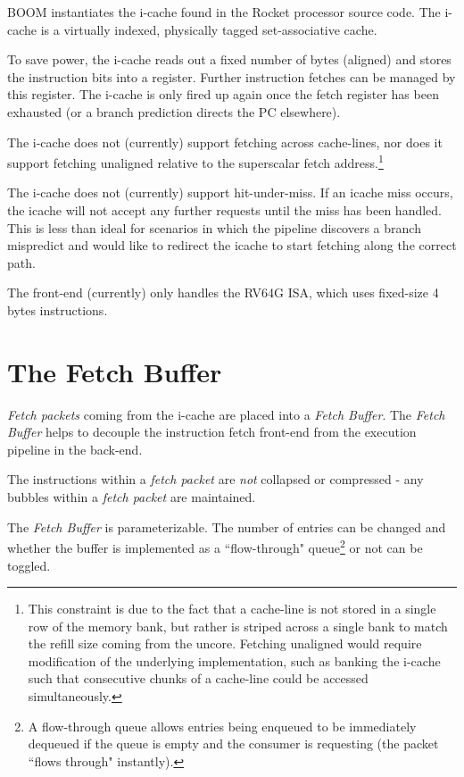 BOOM instantiates the i-cache found in the Rocket processor source code.  The i-cache is a virtually indexed, physically tagged set-associative cache. 

To save power, the i-cache reads out a fixed number of bytes (aligned) and stores the instruction bits into a register. Further instruction fetches can be managed by this register. The i-cache is only fired up again once the fetch register has been exhausted (or a branch prediction directs the PC elsewhere).  

 
The i-cache does not (currently) support fetching across cache-lines, nor does it support fetching unaligned relative to the superscalar fetch address.\footnote{This constraint is due to the fact that a cache-line is not stored in a single row of the memory bank, but rather is striped across a single bank to match the refill size coming from the uncore.  Fetching unaligned would require modification of the underlying implementation, such as banking the i-cache such that consecutive chunks of a cache-line could be accessed simultaneously.}

The i-cache does not (currently) support hit-under-miss.  If an icache miss occurs, the icache will not accept any further requests until the miss has been handled.  This is less than ideal for scenarios in which the pipeline discovers a branch mispredict and would like to redirect the icache to start fetching along the correct path. 


The front-end (currently) only handles the RV64G ISA, which uses fixed-size 4 bytes instructions. 

\section{The Fetch Buffer}

{\em Fetch packets} coming from the i-cache are placed into a {\em Fetch Buffer}.  The {\em Fetch Buffer} helps to decouple the instruction fetch front-end from the execution pipeline in the back-end. 

The instructions within a {\em fetch packet} are {\em not} collapsed or compressed - any bubbles within a {\em fetch packet} are maintained. 

The {\em Fetch Buffer} is parameterizable. The number of entries can be changed and whether the buffer is implemented as a ``flow-through" queue\footnote{A flow-through queue allows entries being enqueued to be immediately dequeued if the queue is empty and the consumer is requesting (the packet ``flows through" instantly).} or not can be toggled.  
